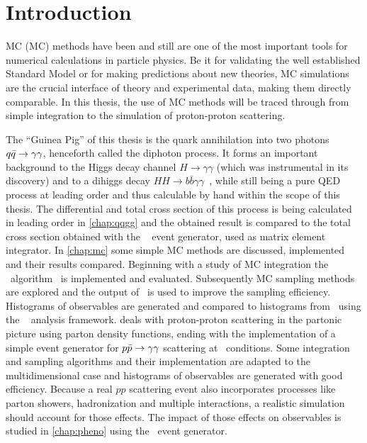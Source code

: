 \chapter{Introduction}%
\label{chap:intro}

MC (MC) methods have been and still are one of the most important
tools for numerical calculations in particle physics. Be it for
validating the well established Standard Model or for making
predictions about new theories, MC simulations are the
crucial interface of theory and experimental data, making them
directly comparable.%
In this thesis, the use of MC methods will be traced through from
simple integration to the simulation of proton-proton scattering.

The ``Guinea Pig'' of this thesis is the quark annihilation into two
photons \(q\bar{q}\rightarrow\gamma\gamma\), henceforth called the diphoton process. It forms an
important background to the Higgs decay channel
\(H\rightarrow \gamma\gamma\) (which was instrumental in its
discovery) and to a dihiggs decay
\(HH\rightarrow b\bar{b}\gamma\gamma\)~\cite{aaboud2018:sf}, while
still being a pure QED process at leading order and thus calculable by
hand within the scope of this thesis. The differential and total cross
section of this process is being calculated in leading order in
\cref{chap:qqgg} and the obtained result is compared to the total
cross section obtained with the \sherpa~\cite{Gleisberg:2008ta} event
generator, used as matrix element integrator. In \cref{chap:mc} some
simple MC methods are discussed, implemented and their results
compared. Beginning with a study of MC integration the \vegas\
algorithm~\cite{Lepage:19781an} is implemented and
evaluated. Subsequently MC sampling methods are explored and the
output of \vegas\ is used to improve the sampling
efficiency. Histograms of observables are generated and compared to
histograms from \sherpa\ using the \rivet~\cite{Bierlich:2019rhm}
analysis framework. \Cref{chap:pdf} deals with proton-proton
scattering in the partonic picture using parton density functions,
ending with the implementation of a simple event generator for
\(p\bar{p}\rightarrow\gamma\gamma\) scattering at \lhc\ conditions. Some integration and
sampling algorithms and their implementation are adapted to the
multidimensional case and histograms of observables are generated with
good efficiency.  Because a real \(pp\) scattering event also
incorporates processes like parton showers, hadronization and multiple
interactions, a realistic simulation should account for those
effects. The impact of those effects on observables is studied in
\cref{chap:pheno} using the \sherpa\ event generator.

